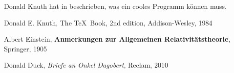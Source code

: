 \documentclass[12pt,ngerman,parskip=half]{scrartcl}
\begin{document}
\blindtext

Donald Knuth hat in \cite{knuth}  beschrieben, was  ein cooles Programm können muss.

\blindtext

\begin{thebibliography}{9}
 Donald E. Knuth, The \TeX\ Book, 2nd edition, Addison-Wesley, 1984

 Albert Einstein, \textbf{Anmerkungen zur Allgemeinen Relativitätstheorie}, Springer, 1905

 Donald Duck, \textit{Briefe an Onkel Dagobert}, Reclam, 2010

\end{thebibliography}
\end{document}
